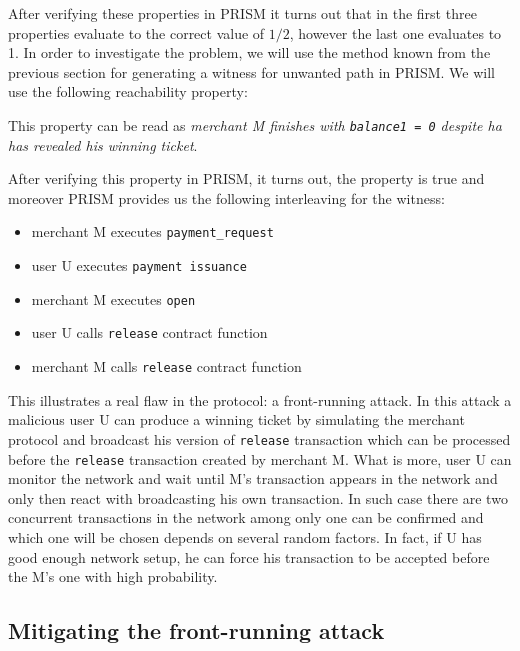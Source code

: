 After verifying these properties in PRISM it turns out that in the first three properties 
evaluate to the correct value of $1/2$, however the last one evaluates to 1.
In order to investigate the problem, we will use the method known from the previous section for generating
a witness for unwanted path in PRISM.
We will use the following reachability property:

This property can be read as \emph{merchant M finishes with \lstinline{balance1 = 0} despite ha has revealed
his winning ticket}.

After verifying this property in PRISM, it turns out, the property is true and moreover PRISM provides us the 
following interleaving for the witness:
\begin{itemize}
\item merchant M executes \lstinline{payment_request}
\item user U executes \lstinline{payment issuance}
\item merchant M executes \lstinline{open}
\item user U calls \lstinline{release} contract function
\item merchant M calls \lstinline{release} contract function
\end{itemize}
This illustrates a real flaw in the protocol: a front-running attack.
In this attack a malicious user U can produce a winning ticket by simulating
the merchant protocol and broadcast his version of \lstinline{release} transaction which can be processed 
before the \lstinline{release} transaction created by merchant M.
What is more, user U can monitor the network and wait until M's transaction appears in the network and only then
react with broadcasting his own transaction.
In such case there are two concurrent transactions in the network among only one can be confirmed
and which one will be chosen depends on several random factors.
In fact, if U has good enough network setup, he can force his transaction to be accepted before the M's one
with high probability.

\subsection{Mitigating the front-running attack}


